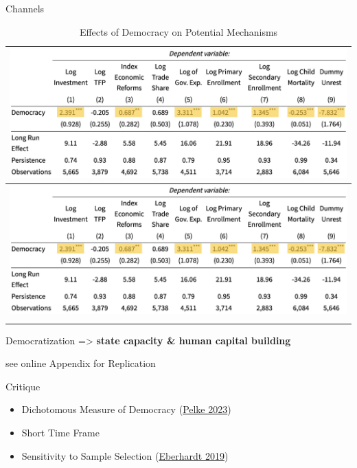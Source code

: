 \documentclass[
  ignorenonframetext,
]{beamer}
\providecommand{\tightlist}{%
  \setlength{\itemsep}{0pt}\setlength{\parskip}{0pt}}\usepackage{longtable,booktabs,array}
\begin{document}
\begin{frame}{Channels}
\protect\hypertarget{channels}{}
\begin{longtable}[]{@{}l@{}}
\caption{Effects of Democracy on Potential Mechanisms}\tabularnewline
\toprule\noalign{}
\includegraphics{output/Table_Channels.jpg} \\
\midrule\noalign{}
\endfirsthead
\toprule\noalign{}
\includegraphics{output/Table_Channels.jpg} \\
\midrule\noalign{}
\endhead
\bottomrule\noalign{}
\end{longtable}

Democratization =\textgreater{} \textbf{state capacity \& human capital
building}

see online Appendix for Replication
\end{frame}

\begin{frame}{Critique}
\protect\hypertarget{critique}{}
\begin{itemize}
\tightlist
\item
  Dichotomous Measure of Democracy
  (\protect\hyperlink{ref-pelkeReanalysingLinkDemocracy2023}{Pelke
  2023})
\item
  Short Time Frame
\item
  Sensitivity to Sample Selection
  (\protect\hyperlink{ref-eberhardtDemocracyDoesCause2019}{Eberhardt
  2019})
\end{itemize}
\end{frame}
\end{document}
